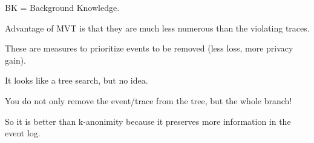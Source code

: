 \nextslides[slide=27] 

BK = Background Knowledge.

\nextslides

\nextslides

\nextslides[until=31] 

\nextslides

\nextslides

\nextslides

Advantage of MVT is that they are much less numerous than the violating traces.

\nextslides

\nextslides

These are measures to prioritize events to be removed (less loss, more privacy gain).

\nextslides[until=44] 

It looks like a tree search, but no idea.

You do not only remove the event/trace from the tree, but the whole branch!

\nextslides

So it is better than k-anonimity because it preserves more information in the event log.

\nextslides








